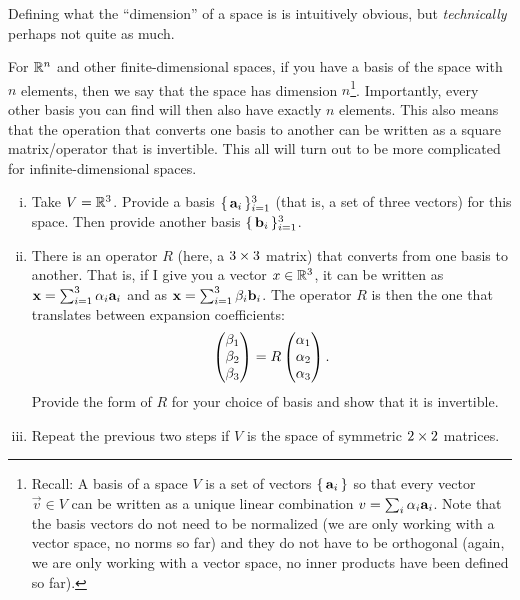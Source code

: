 \documentclass[12pt]{memoir}
\begin{document}
\begin{Ej}
    Defining what the ``dimension'' of a space is is intuitively
obvious, but \emph{technically} perhaps not quite as much.\par
For $\mathbb{R}^n$ and other finite-dimensional spaces, if you have a basis of the space with $n$ elements, then we say that the space has dimension $n$\footnote{Recall: A basis of a space $V$ is a set of vectors $\{\,\mathbf{a}_i\,\}$ so that every vector $\vec v\in V$ can be written as a unique linear combination $v=\sum_i\alpha_i\mathbf{a}_i$. Note that the basis vectors do not need to be normalized (we are only working with a vector space, no norms so far) and they do not have to be orthogonal (again, we are only working with a vector space, no inner products have been
defined so far).}. Importantly, every other basis you can find will then also have exactly $n$ elements. This also means that the operation that converts one basis to another can be written as a square matrix/operator that is invertible. This all will turn out to be more complicated for infinite-dimensional
spaces.
\begin{enumerate}[(i)]
    \item Take $V = \mathbb{R}^3$. Provide a basis $\{\,\mathbf{a}_i\,\}_{i=1}^3$ (that is, a set of three vectors) for this space. Then provide
    another basis $\{\,\mathbf{b}_i\,\}_{i=1}^3$.
    \item There is an operator $R$ (here, a $3\times 3$ matrix) that converts from one basis to another. That is, if I
    give you a vector $x\in\mathbb{R}^3$, it can be written as $\mathbf{x}=\sum_{i=1}^3\alpha_i\mathbf{a}_i$ and as $\mathbf{x}=\sum_{i=1}^3\beta_i\mathbf{b}_i$. The operator $R$ is then the one that translates between expansion coefficients:
    $$\begin{pmatrix} \beta_1 \\ \beta_2 \\ \beta_3 \end{pmatrix}=R\begin{pmatrix} \alpha_1 \\ \alpha_2 \\ \alpha_3 \end{pmatrix}.$$
    Provide the form of $R$ for your choice of basis and show that it is invertible.
    \item Repeat the previous two steps if $V$ is the space of symmetric $2\times 2$ matrices.
\end{enumerate}
\end{Ej}
\end{document}
